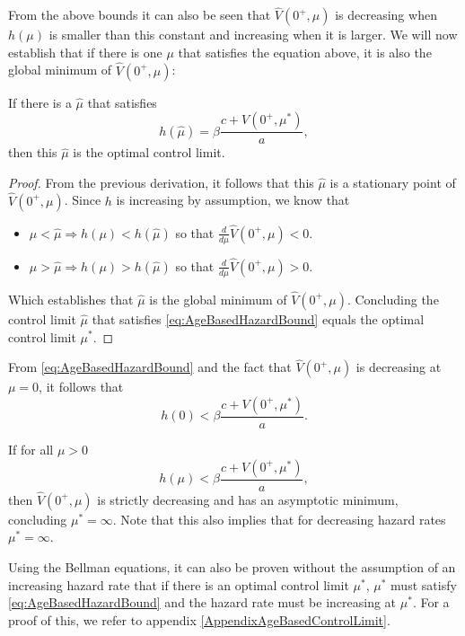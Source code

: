 From the above bounds it can also be seen that $\hat{V}(0^+,\mu)$ is decreasing when $h(\mu)$ is smaller than this constant and increasing when it is larger.
We will now establish that if there is one $\mu$ that satisfies the equation above, it is also the global minimum of $\hat{V}(0^+,\mu)$:
\begin{lemma}
	If there is a $\hat{\mu}$ that satisfies
	\begin{equation}\label{eq:AgeBasedHazardBound}
	h(\hat{\mu})=\beta\frac{c+V(0^+,\mu^*)}{a},
	\end{equation}
	then this $\hat{\mu}$ is the optimal control limit.
	\begin{proof}
		From the previous derivation, it follows that this $\hat{\mu}$ is a stationary point of $\hat{V}(0^+,\mu)$.
		Since $h$ is increasing by assumption, we know that
		\begin{itemize}
			\item $\mu<\hat{\mu}\Rightarrow h(\mu)<h(\hat{\mu})$ so that $\frac{d}{d\mu}\hat{V}(0^+,\mu)<0$.
			\item $\mu>\hat{\mu}\Rightarrow h(\mu)>h(\hat{\mu})$ so that $\frac{d}{d\mu}\hat{V}(0^+,\mu)>0$.
		\end{itemize}
		Which establishes that $\hat{\mu}$ is the global minimum of $\hat{V}(0^+,\mu)$.
		Concluding the control limit $\hat{\mu}$ that satisfies \eqref{eq:AgeBasedHazardBound} equals the optimal control limit $\mu^*$.
	\end{proof}
\end{lemma}
\begin{corollary}
	From \eqref{eq:AgeBasedHazardBound} and the fact that $\hat{V}(0^+,\mu)$ is decreasing at $\mu=0$, it follows that
	\[
	h(0)<\beta\frac{c+V(0^+,\mu^*)}{a}.
	\]
\end{corollary}
\begin{corollary}
If for all $\mu>0$
\[
h(\mu)<\beta\frac{c+V(0^+,\mu^*)}{a},
\]
then $\hat{V}(0^+,\mu)$ is strictly decreasing and has an asymptotic minimum, concluding $\mu^*=\infty$.
Note that this also implies that for decreasing hazard rates $\mu^*=\infty$.
\end{corollary}

\begin{remark}
	Using the Bellman equations, it can also be proven without the assumption of an increasing hazard rate that if there is an optimal control limit $\mu^*$, $\mu^*$ must satisfy \eqref{eq:AgeBasedHazardBound} and the hazard rate must be increasing at $\mu^*$.
	For a proof of this, we refer to appendix \ref{AppendixAgeBasedControlLimit}.
\end{remark}

